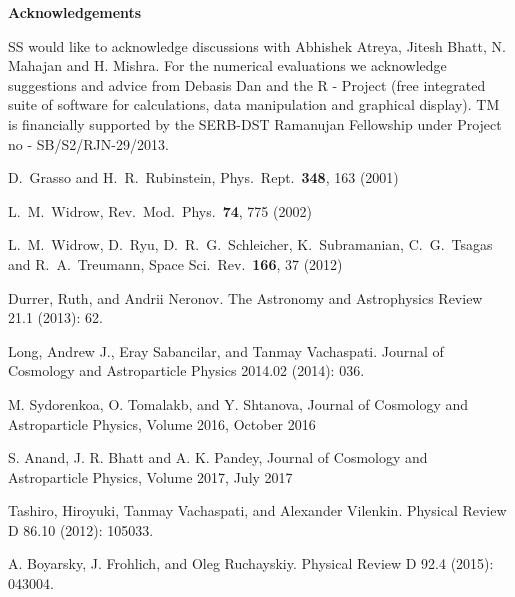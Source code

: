 \documentclass{ws-mpla}
\begin{document}
{\bf Acknowledgements}

SS would like to acknowledge discussions with Abhishek Atreya, Jitesh Bhatt, N. Mahajan and H. Mishra. For the numerical evaluations we acknowledge suggestions and 
advice from Debasis Dan and the R - Project (free integrated suite of software for calculations, data manipulation and graphical display). 
TM is financially supported by the
SERB-DST Ramanujan Fellowship under Project no - SB/S2/RJN-29/2013.






\begin{thebibliography}{99}

  D.~Grasso and H.~R.~Rubinstein,
  Phys.\ Rept.\  {\bf 348}, 163 (2001)



  L.~M.~Widrow,
  Rev.\ Mod.\ Phys.\  {\bf 74}, 775 (2002)



  L.~M.~Widrow, D.~Ryu, D.~R.~G.~Schleicher, K.~Subramanian, C.~G.~Tsagas and R.~A.~Treumann,
  Space Sci.\ Rev.\  {\bf 166}, 37 (2012)


Durrer, Ruth, and Andrii Neronov. 
The Astronomy and Astrophysics Review 21.1 (2013): 62.

Long, Andrew J., Eray Sabancilar, and Tanmay Vachaspati. 
Journal of Cosmology and Astroparticle Physics 2014.02 (2014): 036.

M. Sydorenkoa, O. Tomalakb, and Y. Shtanova,
Journal of Cosmology and Astroparticle Physics, Volume 2016, October 2016 

 S. Anand, J. R. Bhatt and A. K. Pandey,
Journal of Cosmology and Astroparticle Physics, Volume 2017, July 2017 

	Tashiro, Hiroyuki, Tanmay Vachaspati, and Alexander Vilenkin. 
	Physical Review D 86.10 (2012): 105033.

A. Boyarsky, J. Frohlich, and Oleg Ruchayskiy. 
Physical Review D 92.4 (2015): 043004.


\end{thebibliography}
\end{document}
